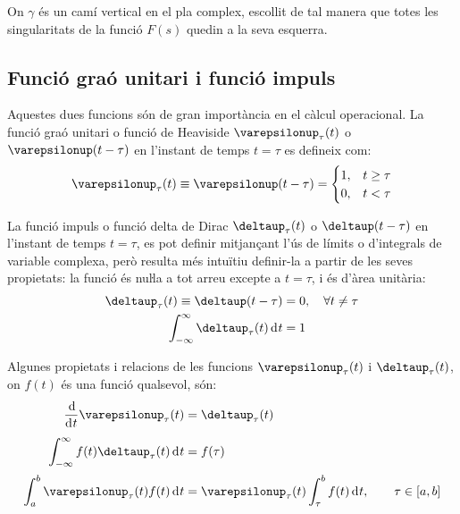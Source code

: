 On $\gamma$ és un camí vertical en el pla complex, escollit de tal
manera que totes les singularitats de la funció $F(s)$ quedin a la
seva esquerra.

\subsection{Funció graó unitari i funció impuls} 

Aquestes dues funcions són de gran importància en el càlcul
operacional. La funció graó unitari o funció de Heaviside
$\varepsilonup_\tau(t)$ o $\varepsilonup(t-\tau)$ en l'instant de temps
$t=\tau$ es defineix com:
\begin{equation}
    \varepsilonup_\tau(t) \equiv \varepsilonup(t-\tau) = \begin{cases} 1, & t \geq \tau \\ 0, & t < \tau \end{cases}
\end{equation}

La funció impuls o funció delta de Dirac $\deltaup_\tau(t)$ o
$\deltaup(t-\tau)$ en l'instant de temps $t=\tau$, es pot definir
mitjançant l'ús de límits o d'integrals de variable complexa, però
resulta més intuïtiu definir-la a partir de les seves propietats: la
funció és nuŀla a tot arreu excepte a $t=\tau$, i és d'àrea
unitària:
\begin{subequations}
\begin{align}
    \deltaup_\tau(t) \equiv \deltaup(t-\tau) &= 0, \quad \forall t \neq \tau \\
    \int_{-\infty}^\infty \deltaup_\tau(t) \diff t &= 1
\end{align}
\end{subequations}

Algunes propietats i relacions de les funcions $\varepsilonup_\tau(t)$ i $\deltaup_\tau(t)$, on $f(t)$ és una funció qualsevol, són:
\begin{align}
   \frac{\diff}{\diff t} \varepsilonup_\tau (t) &= \deltaup_\tau(t) \\[0.5ex]
   \int_{-\infty}^\infty f(t) \deltaup_\tau (t) \diff t &= f(\tau) \\[0.5ex]
    \int_a^b \varepsilonup_\tau (t) f(t) \diff t &= \varepsilonup_\tau(t)
    \int_\tau^b f(t) \diff t, \qquad \tau \in [a, b]
\end{align}



